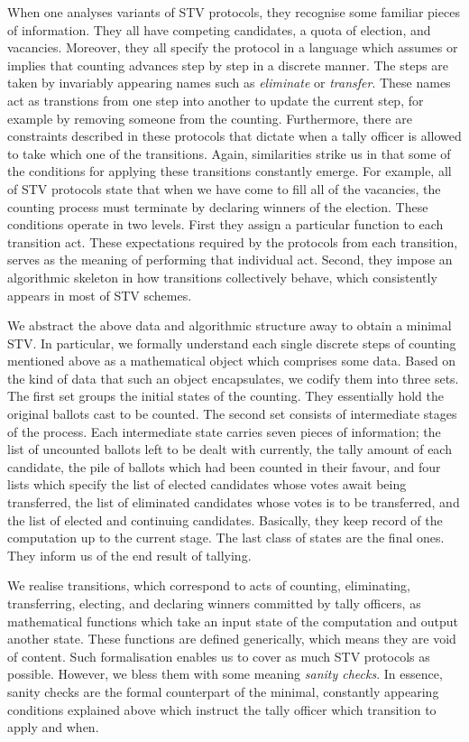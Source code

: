 \documentclass{llncs}
\begin{document}
 
When one analyses variants of STV protocols, they recognise some
familiar pieces of information. They all have competing candidates,
a quota of election, and vacancies. Moreover, they all specify the
protocol in a language which assumes or implies that counting
advances step by step in a discrete manner. The steps are taken by
invariably appearing names such as \emph{eliminate} or
\emph{transfer}. These names act as transtions from one step into
another to update the current step, for example by removing someone
from the counting. Furthermore, there are constraints described in
these protocols that dictate when a tally officer is allowed to take
which one of the transitions.  Again, similarities strike us in that
some of the conditions for applying these transitions constantly
emerge. For example, all of STV protocols state that when we have
come to fill all of the vacancies, the counting process must
terminate by declaring winners of the election. These conditions
operate in two levels. First they assign a particular function to
each transition act. These expectations required by the protocols
from each transition, serves as the meaning of performing that
individual act. Second, they impose an algorithmic skeleton in how
transitions collectively behave, which consistently appears in most
of STV schemes.


We abstract the above data and algorithmic structure away to obtain
a minimal STV. In particular, we formally understand each single
discrete steps of counting mentioned above as a mathematical object
which comprises some data. Based on the kind of data that such an
object encapsulates, we codify them into three sets. The first set
groups the initial states of the counting. They essentially hold the
original ballots cast to be counted. The second set consists of
intermediate stages of the process. Each intermediate state carries
seven pieces of information; the list of uncounted ballots left to
be dealt with currently, the tally amount of each candidate, the
pile of ballots which had been counted in their favour, and four
lists which specify the list of elected candidates whose votes await
being transferred, the list of eliminated candidates whose votes is
to be transferred, and the list of elected and continuing
candidates. Basically, they keep record of the computation up to the
current stage. The last class of states are the final ones. They
inform us of the end result of  tallying.


We realise transitions, which correspond to acts of counting,
eliminating, transferring, electing, and declaring winners committed
by tally officers, as mathematical functions which take an input
state of the computation and output another state. These functions
are defined generically, which means they are void of content. Such
formalisation enables us to cover as much STV protocols as possible.
However, we bless them with some meaning \emph{sanity checks}. In
essence, sanity checks are the formal counterpart of the  minimal,
constantly appearing conditions explained above which instruct the
tally officer which transition to apply and when.  
\end{document}
